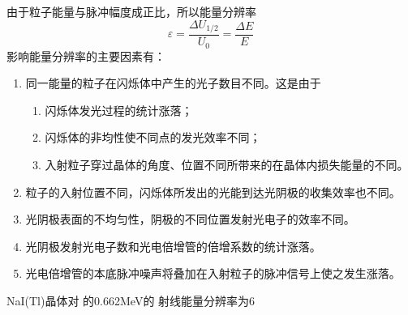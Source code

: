 \documentclass[a4paper]{article}
\begin{document}
\begin{enumerate}
	      由于粒子能量与脉冲幅度成正比，所以能量分辨率
	      \begin{equation}
		      \varepsilon = \frac{\Delta U_{1/2}}{U_0} = \frac{\Delta E}{E}\label{eq13}
	      \end{equation}
	      影响能量分辨率的主要因素有：
	      \begin{enumerate}
		      \item 同一能量的粒子在闪烁体中产生的光子数目不同。这是由于
		            \begin{enumerate}
			            \item 闪烁体发光过程的统计涨落；
			            \item 闪烁体的非均性使不同点的发光效率不同；
			            \item 入射粒子穿过晶体的角度、位置不同所带来的在晶体内损失能量的不同。
		            \end{enumerate}
		      \item 粒子的入射位置不同，闪烁体所发出的光能到达光阴极的收集效率也不同。
		      \item 光阴极表面的不均匀性，阴极的不同位置发射光电子的效率不同。
		      \item 光阴极发射光电子数和光电倍增管的倍增系数的统计涨落。
		      \item 光电倍增管的本底脉冲噪声将叠加在入射粒子的脉冲信号上使之发生涨落。
	      \end{enumerate}
	      NaI(Tl)晶体对 的0.662MeV的 射线能量分辨率为6%
\end{enumerate}
\end{document}
